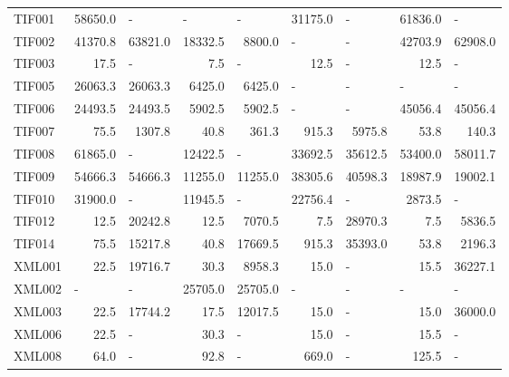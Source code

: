 \documentclass[lettersize,journal]{IEEEtran}
\begin{document}
\begin{table}[t!]
{\begin{tabular}{lrrrrrrrr}
			\midrule
			TIF001 & 58650.0  & \multicolumn{1}{l}{-} & \multicolumn{1}{l}{-} & \multicolumn{1}{l}{-} & 31175.0  & \multicolumn{1}{l}{-} & 61836.0  & \multicolumn{1}{l}{-} \\
			TIF002 & 41370.8  & 63821.0  & 18332.5  & 8800.0  & \multicolumn{1}{l}{-} & \multicolumn{1}{l}{-} & 42703.9  & 62908.0  \\
			TIF003 & 17.5  & \multicolumn{1}{l}{-} & 7.5   & \multicolumn{1}{l}{-} & 12.5  & \multicolumn{1}{l}{-} & 12.5  & \multicolumn{1}{l}{-} \\
			TIF005 & 26063.3  & 26063.3  & 6425.0  & 6425.0  & \multicolumn{1}{l}{-} & \multicolumn{1}{l}{-} & \multicolumn{1}{l}{-} & \multicolumn{1}{l}{-} \\
			TIF006 & 24493.5  & 24493.5  & 5902.5  & 5902.5  & \multicolumn{1}{l}{-} & \multicolumn{1}{l}{-} & 45056.4  & 45056.4  \\
			TIF007 & 75.5  & 1307.8  & 40.8  & 361.3  & 915.3  & 5975.8  & 53.8  & 140.3  \\
			TIF008 & 61865.0  & \multicolumn{1}{l}{-} & 12422.5  & \multicolumn{1}{l}{-} & 33692.5  & 35612.5  & 53400.0  & 58011.7  \\
			TIF009 & 54666.3  & 54666.3  & 11255.0  & 11255.0  & 38305.6  & 40598.3  & 18987.9  & 19002.1  \\
			TIF010 & 31900.0  & \multicolumn{1}{l}{-} & 11945.5  & \multicolumn{1}{l}{-} & 22756.4  & \multicolumn{1}{l}{-} & 2873.5  & \multicolumn{1}{l}{-} \\
			TIF012 & 12.5  & 20242.8  & 12.5  & 7070.5  & 7.5   & 28970.3  & 7.5   & 5836.5  \\
			TIF014 & 75.5  & 15217.8  & 40.8  & 17669.5  & 915.3  & 35393.0  & 53.8  & 2196.3  \\
			\midrule
			XML001 & 22.5  & 19716.7  & 30.3  & 8958.3  & 15.0  & \multicolumn{1}{l}{-} & 15.5  & 36227.1  \\
			XML002 & \multicolumn{1}{l}{-} & \multicolumn{1}{l}{-} & 25705.0  & 25705.0  & \multicolumn{1}{l}{-} & \multicolumn{1}{l}{-} & \multicolumn{1}{l}{-} & \multicolumn{1}{l}{-} \\
			XML003 & 22.5  & 17744.2  & 17.5  & 12017.5  & 15.0  & \multicolumn{1}{l}{-} & 15.0  & 36000.0  \\
			XML006 & 22.5  & \multicolumn{1}{l}{-} & 30.3  & \multicolumn{1}{l}{-} & 15.0  & \multicolumn{1}{l}{-} & 15.5  & \multicolumn{1}{l}{-} \\
			XML008 & 64.0  & \multicolumn{1}{l}{-} & 92.8  & \multicolumn{1}{l}{-} & 669.0  & \multicolumn{1}{l}{-} & 125.5  & \multicolumn{1}{l}{-} \\

\end{tabular}}
\end{table}
\end{document}

